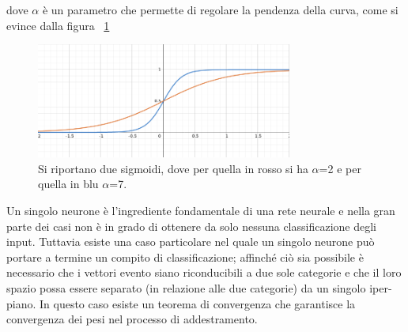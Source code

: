 dove $\alpha$ è un parametro che permette di regolare la pendenza della curva, come si evince dalla figura ~\ref{sigmoide}
\begin{figure}[h!]
	\centering
	\includegraphics[width=0.75\textwidth]{figs/sigmoide.png}
	\caption{Si riportano due sigmoidi, dove per quella in rosso si ha $\alpha$=2 e per quella in blu $\alpha$=7.}
	\label{sigmoide}
\end{figure}
\newpage
Un singolo neurone è l'ingrediente fondamentale di una rete neurale e nella gran parte dei casi non è in grado di ottenere da solo nessuna classificazione degli input. Tuttavia esiste una caso particolare nel quale un singolo neurone può portare a termine un compito di classificazione; affinché ciò sia possibile è necessario che i vettori evento siano riconducibili a due sole categorie e che il loro spazio possa essere separato (in relazione alle due categorie) da un singolo iper-piano. In questo caso esiste un teorema di convergenza che garantisce la convergenza dei pesi nel processo di addestramento.

